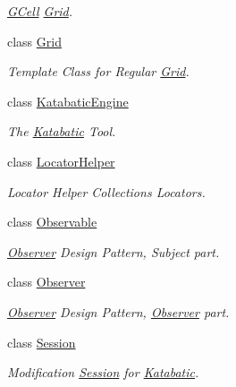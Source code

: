 \begin{DoxyCompactItemize}
\begin{DoxyCompactList}\small\item\em \hyperlink{classKatabatic_1_1GCell}{G\+Cell} \hyperlink{classKatabatic_1_1Grid}{Grid}. \end{DoxyCompactList}\item 
class \hyperlink{classKatabatic_1_1Grid}{Grid}
\begin{DoxyCompactList}\small\item\em Template Class for Regular \hyperlink{classKatabatic_1_1Grid}{Grid}. \end{DoxyCompactList}\item 
class \hyperlink{classKatabatic_1_1KatabaticEngine}{Katabatic\+Engine}
\begin{DoxyCompactList}\small\item\em The \hyperlink{namespaceKatabatic}{Katabatic} Tool. \end{DoxyCompactList}\item 
class \hyperlink{classKatabatic_1_1LocatorHelper}{Locator\+Helper}
\begin{DoxyCompactList}\small\item\em Locator Helper Collection\textquotesingle{}s Locators. \end{DoxyCompactList}\item 
class \hyperlink{classKatabatic_1_1Observable}{Observable}
\begin{DoxyCompactList}\small\item\em \hyperlink{classKatabatic_1_1Observer}{Observer} Design Pattern, Subject part. \end{DoxyCompactList}\item 
class \hyperlink{classKatabatic_1_1Observer}{Observer}
\begin{DoxyCompactList}\small\item\em \hyperlink{classKatabatic_1_1Observer}{Observer} Design Pattern, \hyperlink{classKatabatic_1_1Observer}{Observer} part. \end{DoxyCompactList}\item 
class \hyperlink{classKatabatic_1_1Session}{Session}
\begin{DoxyCompactList}\small\item\em Modification \hyperlink{classKatabatic_1_1Session}{Session} for \hyperlink{namespaceKatabatic}{Katabatic}. \end{DoxyCompactList}\end{DoxyCompactItemize}
